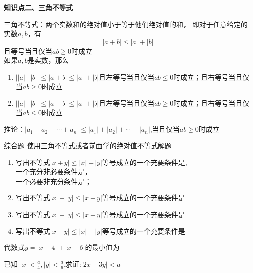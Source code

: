 \documentclass[11pt,a4paper]{ctexbook}
\begin{document}
\begin{formal}
    {\large \textbf{知识点二、三角不等式}}
\end{formal}
三角不等式：两个实数和的绝对值小于等于他们绝对值的和，
即对于任意给定的实数$a,b$，有$$|a+b|\le|a|+|b|$$且等号当且仅当$ab\ge0$时成立\\
如果$a,b$是实数，那么

\begin{enumerate}
    \item $||a|-|b||\le|a+b|\le |a|+|b|$且左等号当且仅当$ab\le0$时成立；且右等号当且仅当$ab\ge0$时成立
    \item $||a|-|b||\le|a-b|\le |a|+|b|$且左等号当且仅当$ab\ge0$时成立；且右等号当且仅当$ab\le0$时成立
\end{enumerate}

推论：$|a_1+a_2+\cdots+a_n|\le |a_1|+|a_2|+\cdots+|a_n|$,当且仅当$ab\ge0$时成立


\begin{tcolorbox} 
    \centering
    综合题
    \tcblower %
    使用三角不等式或者前面学的绝对值不等式解题
\end{tcolorbox}


\par
\begin{problem}
    \begin{enumerate}
        \item 写出不等式$|x+y|\le|x|+|y|$等号成立的一个充要条件是,\\
        一个充分非必要条件是，\\
        一个必要非充分条件是；
        \item 写出不等式$|x|-|y|\le|x-y|$等号成立的一个充要条件是
        \item 写出不等式$|x|-|y|\le|x+y|$等号成立的一个充要条件是
        \item 写出不等式$|x-y|\le|x|+|y|$等号成立的一个充要条件是
    \end{enumerate}
\end{problem}

\par
\begin{problem}
    代数式$y=|x-4|+|x-6|$的最小值为
\end{problem}

\par
\begin{problem}
    已知 $\displaystyle |x|<\frac{a}{4},|y|<\frac{a}{6}.$求证:$|2x-3y|<a$
\end{problem}
\end{document}
